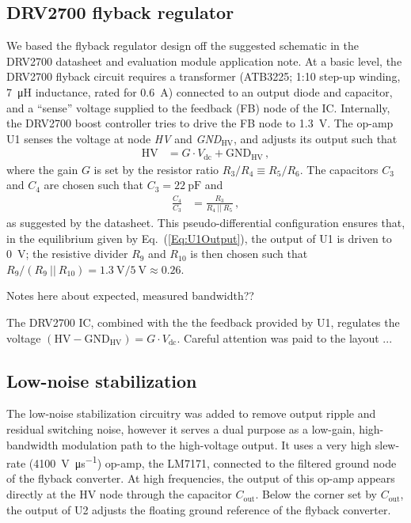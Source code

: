 \documentclass[aip,rsi,reprint]{revtex4-1} %
\begin{document}
\subsection{DRV2700 flyback regulator}
\label{Sec:DRV2700}

We based the flyback regulator design off the suggested schematic in the DRV2700 datasheet and evaluation module application note.
At a basic level, the DRV2700 flyback circuit requires a transformer (ATB3225; 1:10 step-up winding, \SI{7}{\micro\henry} inductance, rated for \SI{0.6}{\ampere}) connected to an output diode and capacitor, and a ``sense'' voltage supplied to the feedback (FB) node of the IC.
Internally, the DRV2700 boost controller tries to drive the FB node to \SI{1.3}{\volt}.
The op-amp U1 senses the voltage at node \textit{HV} and \textit{GND}${}_\text{HV}$, and adjusts its output such that
\begin{align}
\label{Eq:U1Output}
\text{HV} &= G\cdot V_{\text{dc}} + \text{GND}_{\text{HV}}\,,
\end{align}
where the gain $G$ is set by the resistor ratio $R_3/R_4 \equiv R_5/R_6$.
The capacitors $C_3$ and $C_4$ are chosen such that $C_3 = \SI{22}{\pico\farad}$ and 
\begin{align}
\frac{C_4}{C_3} &= \frac{R_3}{R_4~||~R_5}\,,
\end{align}
as suggested by the datasheet.
This pseudo-differential configuration ensures that, in the equilibrium given by Eq.~(\ref{Eq:U1Output}), the output of U1 is driven to \SI{0}{\volt}; the resistive divider $R_9$ and $R_{10}$ is then chosen such that $R_9/(R_9~||~R_{10}) = \SI{1.3}{\volt}/\SI{5}{\volt} \approx \num{0.26}$.



Notes here about expected, measured bandwidth??

The DRV2700 IC, combined with the the feedback provided by U1, regulates the voltage $(\text{HV}-\text{GND}_{\text{HV}}) = G\cdot V_{\text{dc}}$.
Careful attention was paid to the layout ...

\subsection{Low-noise stabilization}
\label{Sec:LowNoiseStabilization}

The low-noise stabilization circuitry was added to remove output ripple and residual switching noise, however it serves a dual purpose as a low-gain, high-bandwidth modulation path to the high-voltage output.
It uses a very high slew-rate (\SI{4100}{\volt\per\micro\second}) op-amp, the LM7171, connected to the filtered ground node of the flyback converter.
At high frequencies, the output of this op-amp appears directly at the HV node through the capacitor $C_{\text{out}}$.
Below the corner set by $C_{\text{out}}$, the output of U2 adjusts the floating ground reference of the flyback converter.
\end{document}
